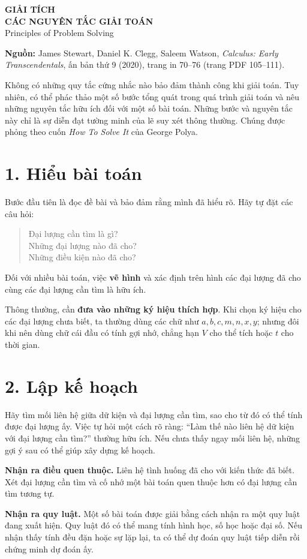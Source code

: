 \documentclass[12pt,a4paper]{article}
\begin{document}
\begin{center}
{\Large\bfseries GIẢI TÍCH}\\[5pt]
{\Large\bfseries CÁC NGUYÊN TẮC GIẢI TOÁN}\\[5pt]
{\large Principles of Problem Solving}
\end{center}
\noindent\textbf{Nguồn:} James Stewart, Daniel K. Clegg, Saleem Watson, \textit{Calculus: Early Transcendentals}, ấn bản thứ 9 (2020), trang in 70–76 (trang PDF 105–111).

Không có những quy tắc cứng nhắc nào bảo đảm thành công khi giải toán. Tuy nhiên, có thể phác thảo một số bước tổng quát trong quá trình giải toán và nêu những nguyên tắc hữu ích đối với một số bài toán. Những bước và nguyên tắc này chỉ là sự diễn đạt tường minh của lẽ suy xét thông thường. Chúng được phỏng theo cuốn \textit{How To Solve It} của George Polya.
\section*{1. Hiểu bài toán}
Bước đầu tiên là đọc đề bài và bảo đảm rằng mình đã hiểu rõ. Hãy tự đặt các câu hỏi:
\begin{quote}
Đại lượng cần tìm là gì?\\
Những đại lượng nào đã cho?\\
Những điều kiện nào đã cho?
\end{quote}
Đối với nhiều bài toán, việc \textbf{vẽ hình} và xác định trên hình các đại lượng đã cho cùng các đại lượng cần tìm là hữu ích.

Thông thường, cần \textbf{đưa vào những ký hiệu thích hợp}. Khi chọn ký hiệu cho các đại lượng chưa biết, ta thường dùng các chữ như $a,b,c,m,n,x,y$; nhưng đôi khi nên dùng chữ cái đầu có tính gợi nhớ, chẳng hạn $V$ cho thể tích hoặc $t$ cho thời gian.
\section*{2. Lập kế hoạch}
Hãy tìm mối liên hệ giữa dữ kiện và đại lượng cần tìm, sao cho từ đó có thể tính được đại lượng ấy. Việc tự hỏi một cách rõ ràng: ``Làm thế nào liên hệ dữ kiện với đại lượng cần tìm?'' thường hữu ích. Nếu chưa thấy ngay mối liên hệ, những gợi ý sau có thể giúp xây dựng kế hoạch.

\noindent\textbf{Nhận ra điều quen thuộc.} Liên hệ tình huống đã cho với kiến thức đã biết. Xét đại lượng cần tìm và cố nhớ một bài toán quen thuộc hơn có đại lượng cần tìm tương tự.

\noindent\textbf{Nhận ra quy luật.} Một số bài toán được giải bằng cách nhận ra một quy luật đang xuất hiện. Quy luật đó có thể mang tính hình học, số học hoặc đại số. Nếu nhận thấy tính đều đặn hoặc sự lặp lại, ta có thể dự đoán quy luật tiếp diễn rồi chứng minh dự đoán ấy.
\end{document}
